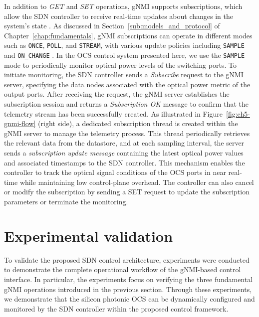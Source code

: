 In addition to \textit{GET} and \textit{SET} operations, gNMI supports subscriptions, which allow the SDN controller to receive real-time updates about changes in the system's state \cite{rfc9232, openconfig_gnmi_spec}.
As discussed in Section~\ref{sub:models_and_protocol} of Chapter~\ref{chap:fundamentals}, gNMI subscriptions can operate in different modes such as \texttt{ONCE}, \texttt{POLL}, and \texttt{STREAM}, with various update policies including \texttt{SAMPLE} and \texttt{ON\_CHANGE} \cite{openconfig_gnmi_spec}.
In the OCS control system presented here, we use the \texttt{SAMPLE} mode to periodically monitor optical power levels of the switching ports.
To initiate monitoring, the SDN controller sends a \textit{Subscribe} request to the gNMI server, specifying the data nodes associated with the optical power metric of the output ports.
After receiving the request, the gNMI server establishes the subscription session and returns a \textit{Subscription OK} message to confirm that the telemetry stream has been successfully created.
As illustrated in Figure~\ref{fig:ch5-gnmi-flow} (right side), a dedicated subscription thread is created within the gNMI server to manage the telemetry process.
This thread periodically retrieves the relevant data from the datastore, and at each sampling interval, the server sends a \textit{subscription update message} containing the latest optical power values and associated timestamps to the SDN controller.
This mechanism enables the controller to track the optical signal conditions of the OCS ports in near real-time while maintaining low control-plane overhead.
The controller can also cancel or modify the subscription by sending a SET request to update the subscription parameters or terminate the monitoring.

\section{Experimental validation}\label{sec:experimental} %
To validate the proposed SDN control architecture, experiments were conducted to demonstrate the complete operational workflow of the gNMI-based control interface.
In particular, the experiments focus on verifying the three fundamental gNMI operations introduced in the previous section.
Through these experiments, we demonstrate that the silicon photonic OCS can be dynamically configured and monitored by the SDN controller within the proposed control framework.

